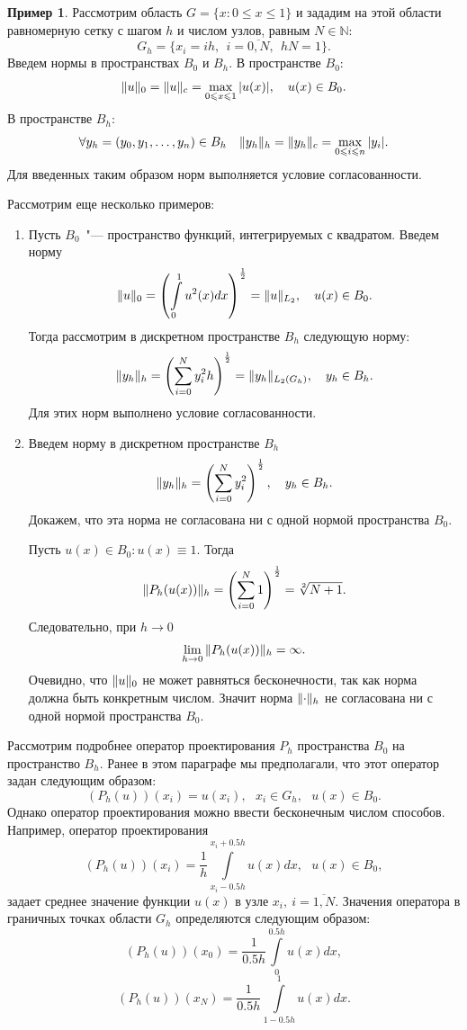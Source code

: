 \documentclass[11pt,a4paper,twoside,listtotoc,bibtotoc]{report}
\numberwithin{equation}{section}
\theoremstyle{definition}
\newtheorem*{example*}{Пример}
\theoremstyle{plain}
\DeclarePairedDelimiter\norm{\lVert}{\rVert}
\begin{document}
%
\begin{example*}
%
Рассмотрим область $G = \{ x: 0 \leqslant x \leqslant 1\}$ и зададим на этой области
равномерную сетку с шагом $h$ и числом узлов, равным $N \in \mathbb{N}$:
%
$$
    G_h = \{x_i = ih,~~i = \overline{0,N},~~hN = 1 \}.
$$
%
Введем нормы в пространствах $B_0$ и  $B_h$. В пространстве $B_0$:
%
$$
    \norm{u}_0=\norm{u}_c=\max_{0 \leqslant x \leqslant 1}{|u(x)|},~~~u(x)\in B_0.
$$
%
В пространстве $B_h$:
%
$$
    \forall y_h=(y_0,y_1,\ldots,y_n) \in B_h
%
%
    ~~~\norm{y_h}_h=\norm{y_h}_c=\max_{0\leqslant i \leqslant n}{|y_i|}.
$$
%
Для введенных таким образом норм выполняется условие согласованности.
%
\end{example*}
%
Рассмотрим еще несколько примеров:
%
\begin{enumerate}
%
    \item
        Пусть $B_0$~"--- пространство функций, интегрируемых с квадратом. Введем норму
        $$
            \norm{u}_0 = \left(\int\limits_0^1{u^2(x)dx}\right)^{\frac12}=\norm{u}_{L_2},~~~u(x) \in B_0.
        $$
        Тогда рассмотрим в дискретном пространстве $B_h$ следующую норму:
        $$
             \norm{y_h}_h = \left(\sum_{i=0}^N{y_i^2 h}\right)^{\frac12}=\norm{y_h}_{L_2(G_h)},~~~y_h \in B_h.
        $$
        Для этих норм выполнено условие согласованности.
    \item
        Введем норму в дискретном пространстве $B_h$
        $$
            \norm{y_h}_h= \left( \sum_{i = 0}^N {y_i^2}\right)^{\frac12},~~~y_h \in B_h.
        $$
        Докажем, что эта норма не согласована ни с одной нормой пространства $B_0$.

        Пусть $u(x)\in B_0: u(x) \equiv 1$.
        Тогда
        $$
            \norm{P_h(u(x))}_h=\left( \sum_{i = 0}^N {1}\right)^{\frac12}= \sqrt[2]{N+1}.
        $$
        Следовательно, при $h\rightarrow0$
        $$
            \lim\limits_{h\rightarrow0}{\norm{P_h(u(x))}_h}=\infty.
        $$
        Очевидно, что $\norm{u}_0$ не может равняться бесконечности,
        так как норма должна быть конкретным числом. Значит норма $\norm{\cdot}_h$
        не согласована ни с одной нормой пространства $B_0$.
%
\end{enumerate}
%


Рассмотрим подробнее оператор проектирования $P_h$ пространства $B_0$
на пространство $B_h$. Ранее в этом параграфе мы предполагали, что
этот оператор задан следующим образом:
%
$$
    (P_h(u))(x_i)=u(x_i),~~~x_i\in G_h,~~~u(x) \in B_0.
$$
%
Однако оператор проектирования можно ввести бесконечным числом способов.
Например, оператор проектирования
%
$$
    (P_h(u))(x_i) = \frac1h \int\limits_{x_i - 0.5h}^{x_i + 0.5h}{u(x)dx},~~~u(x) \in B_0,
$$
%
задает среднее значение функции $u(x)$ в узле $x_i,~i=\overline{1,N}$. Значения оператора
в граничных точках области $G_h$ определяются следующим образом:
%
$$
    (P_h(u))(x_0) = \frac1{0.5h} \int\limits_{0}^{0.5h}{u(x)dx},
$$
%
$$
    (P_h(u))(x_N) = \frac1{0.5h} \int\limits_{1-0.5h}^{1}{u(x)dx}.
$$
%
\end{document}
